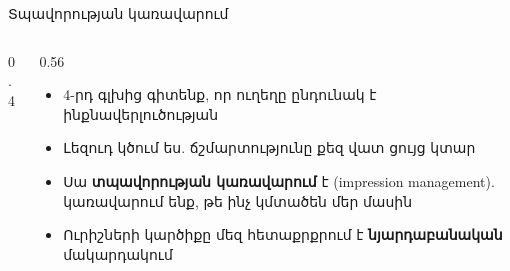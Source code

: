 \begin{frame}{Տպավորության կառավարում}
  \begin{columns}[c]
    \begin{column}{0.4\textwidth}
      \centering
    \end{column}
    \begin{column}{0.56\textwidth}
      \begin{itemize}
        \item 4-րդ գլխից գիտենք, որ ուղեղը ընդունակ է ինքնավերլուծության
        \item<2-> Լեզուդ կծում ես. ճշմարտությունը քեզ վատ ցույց կտար
        \item<3-> Սա \textbf{տպավորության կառավարում} է (impression management). կառավարում ենք, թե ինչ կմտածեն մեր մասին
        \item<4-> Ուրիշների կարծիքը մեզ հետաքրքրում է \textbf{նյարդաբանական} մակարդակում
      \end{itemize}
    \end{column}
  \end{columns}
\end{frame}

